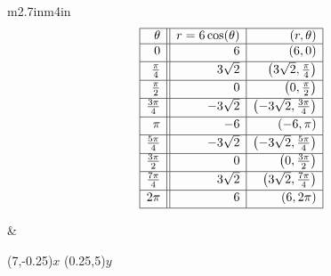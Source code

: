 \hspace{.25in} \begin{tabular}{m{2.7in}m{4in}}
\setlength{\extrarowheight}{2pt}
\[ \begin{array}{|r||r|r|}  

\hline

\theta & r = 6\cos(\theta) & (r,\theta) \\ \hline
0  & 6 & (6,0) \\ [2pt]   \hline
\frac{\pi}{4}  & 3\sqrt{2} & \left(3\sqrt{2}, \frac{\pi}{4}\right) \\ [2pt] \hline 
\frac{\pi}{2}  & 0 & \left(0,\frac{\pi}{2}\right) \\ [2pt] \hline 
\frac{3\pi}{4}  & -3\sqrt{2} & \left(-3\sqrt{2}, \frac{3\pi}{4}\right) \\ [2pt] \hline 
\pi & -6 & (-6,\pi) \\ [2pt] \hline 
\frac{5\pi}{4}  & -3\sqrt{2} & \left(-3\sqrt{2}, \frac{5\pi}{4}\right) \\ [2pt] \hline 
\frac{3\pi}{2}  & 0 & \left(0, \frac{3\pi}{2} \right) \\ [2pt] \hline 
\frac{7\pi}{4}  & 3\sqrt{2} & \left(3\sqrt{2}, \frac{7\pi}{4}\right) \\ [2pt] \hline 
2\pi  & 6 & (6,2\pi) \\  [2pt] \hline
\end{array} \]
\setlength{\extrarowheight}{0pt}

& 
\hspace*{.5in}
\begin{mfpic}[15]{-3}{7}{-5}{5}
\axes
{}
\tlabel[cc](7,-0.25){\scriptsize $x$}
\tlabel[cc](0.25,5){\scriptsize $y$}
\tlpointsep{4pt}
\scriptsize
{}
\normalsize
\end{mfpic}

\end{tabular}

